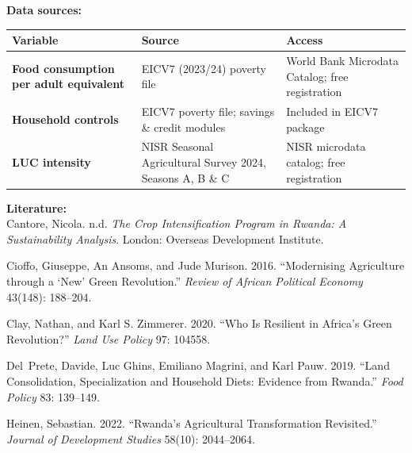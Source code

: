 \documentclass[11pt]{article}
\begin{document}
\noindent \textbf{Data sources:}

\vspace{0.3cm}
\noindent
\begin{tabularx}{\textwidth}{>{\bfseries}p{3.0cm} >{\RaggedRight}X >{\RaggedRight}p{3.6cm}}
\toprule
\normalfont\textbf{Variable} & \textbf{Source} & \textbf{Access} \\
\midrule
Food consumption per adult equivalent
    & EICV7 (2023/24) poverty file
    & World Bank Microdata Catalog; free registration \\
\hline
Household controls
    & EICV7 poverty file; savings \& credit modules
    & Included in EICV7 package \\
\hline
LUC intensity
    & NISR Seasonal Agricultural Survey 2024, Seasons A, B \& C
    & NISR microdata catalog; free registration \\
\bottomrule
\end{tabularx}

\vspace{0.4cm}

\noindent \textbf{Literature:} \\

\noindent Cantore, Nicola. n.d. \textit{The Crop Intensification Program in
Rwanda: A Sustainability Analysis}. London: Overseas Development Institute.
\vspace{0.2cm}

\noindent Cioffo, Giuseppe, An Ansoms, and Jude Murison. 2016.
``Modernising Agriculture through a `New' Green Revolution.''
\textit{Review of African Political Economy} 43(148): 188--204.
\vspace{0.2cm}

\noindent Clay, Nathan, and Karl S. Zimmerer. 2020. ``Who Is Resilient in
Africa's Green Revolution?'' \textit{Land Use Policy} 97: 104558.
\vspace{0.2cm}

\noindent Del~Prete, Davide, Luc Ghins, Emiliano Magrini, and Karl Pauw.
2019. ``Land Consolidation, Specialization and Household Diets: Evidence
from Rwanda.'' \textit{Food Policy} 83: 139--149.
\vspace{0.2cm}

\noindent Heinen, Sebastian. 2022. ``Rwanda's Agricultural Transformation
Revisited.'' \textit{Journal of Development Studies} 58(10): 2044--2064.
\vspace{0.2cm}
\end{document}
